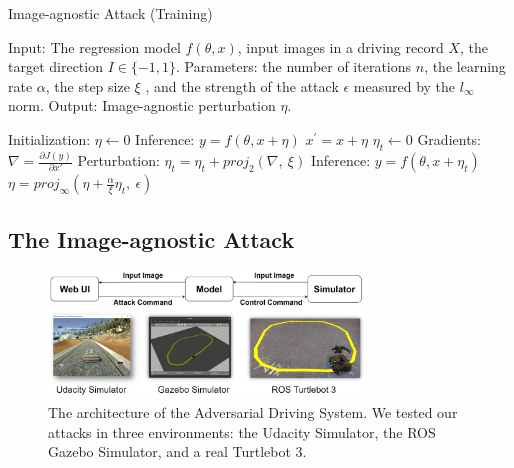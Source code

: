 
\begin{algorithm}[t]
    \caption{Image-agnostic Attack (Training)}\label{alg:image-agnostic}
    \begin{algorithmic}
        \STATE Input: The regression model $f(\theta, x)$, input images in a driving record $X$, the target direction $I \in \{-1, 1\}$.
        \STATE Parameters: the number of iterations $n$, the learning rate $\alpha$, the step size $\xi$ , and the strength of the attack $\epsilon$ measured by the $l_{\infty}$ norm.
        \STATE Output: Image-agnostic perturbation $\eta$.

        \STATE Initialization: $\eta \leftarrow 0$
                \STATE Inference: $y = f(\theta, x + \eta)$
                    \STATE $x^{'} = x + \eta$
                    \STATE $\eta_{t} \leftarrow 0$
                        \STATE Gradients: $\nabla = \frac{\partial J(y)}{\partial x'}$
                        \STATE Perturbation: $\eta_{t} = \eta_{t} + proj_{2}(\nabla,\ \xi)$
                        \STATE Inference: $y = f(\theta, x + \eta_t)$
                    \ENDWHILE
                    \STATE $\eta = proj_{\infty}(\eta + \frac{\alpha}{\xi} \eta_{t},\ \epsilon)$
                \ENDIF
            \ENDFOR
        \ENDFOR
    \end{algorithmic}
\end{algorithm}

\subsection{The Image-agnostic Attack}

\begin{figure}[b]
    \centering
    \includegraphics[width=0.75\textwidth]{figures/chapter_driving/architechture.jpg}
    \caption{The architecture of the Adversarial Driving System. We tested our attacks in three environments: the Udacity Simulator, the ROS Gazebo Simulator, and a real Turtlebot 3.}
    \label{fig:arch}
\end{figure}

